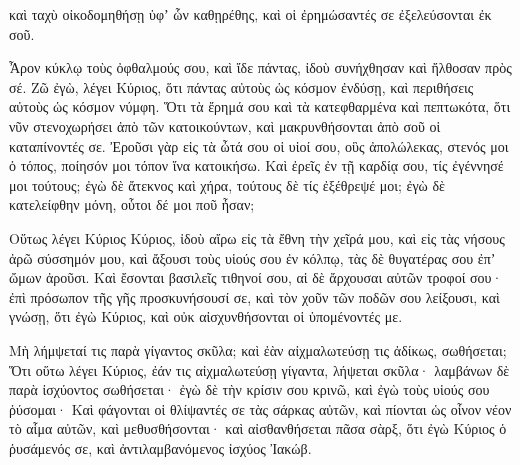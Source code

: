 {καὶ ταχὺ οἰκοδομηθήσῃ ὑφʼ ὧν καθῃρέθης, καὶ οἱ ἐρημώσαντές σε ἐξελεύσονται ἐκ σοῦ.
\par }{\PP {}Ἆρον κύκλῳ τοὺς ὀφθαλμούς σου, καὶ ἴδε πάντας, ἰδοὺ συνήχθησαν καὶ ἤλθοσαν πρὸς σέ. Ζῶ ἐγὼ, λέγει Κύριος, ὅτι πάντας αὐτοὺς ὡς κόσμον ἐνδύσῃ, καὶ περιθήσεις αὐτοὺς ὡς κόσμον νύμφη.
Ὅτι τὰ ἔρημά σου καὶ τὰ κατεφθαρμένα καὶ πεπτωκότα, ὅτι νῦν στενοχωρήσει ἀπὸ τῶν κατοικούντων, καὶ μακρυνθήσονται ἀπὸ σοῦ οἱ καταπίνοντές σε.
Ἐροῦσι γὰρ εἰς τὰ ὦτά σου οἱ υἱοί σου, οὓς ἀπολώλεκας, στενός μοι ὁ τόπος, ποίησόν μοι τόπον ἵνα κατοικήσω.
Καὶ ἐρεῖς ἐν τῇ καρδίᾳ σου, τίς ἐγέννησέ μοι τούτους; ἐγὼ δὲ ἄτεκνος καὶ χήρα, τούτους δὲ τίς ἐξέθρεψέ μοι; ἐγὼ δὲ κατελείφθην μόνη, οὗτοι δέ μοι ποῦ ἦσαν;
\par }{\PP {}Οὕτως λέγει Κύριος Κύριος, ἰδοὺ αἴρω εἰς τὰ ἔθνη τὴν χεῖρά μου, καὶ εἰς τὰς νήσους ἀρῶ σύσσημόν μου, καὶ ἄξουσι τοὺς υἱούς σου ἐν κόλπῳ, τὰς δὲ θυγατέρας σου ἐπʼ ὤμων ἀροῦσι.
Καὶ ἔσονται βασιλεῖς τιθηνοί σου, αἱ δὲ ἄρχουσαι αὐτῶν τροφοί σου· ἐπὶ πρόσωπον τῆς γῆς προσκυνήσουσί σε, καὶ τὸν χοῦν τῶν ποδῶν σου λείξουσι, καὶ γνώσῃ, ὅτι ἐγὼ Κύριος, καὶ οὐκ αἰσχυνθήσονται οἱ ὑπομένοντές με.
\par }{\PP {}Μὴ λήμψεταί τις παρὰ γίγαντος σκῦλα; καὶ ἐὰν αἰχμαλωτεύσῃ τις ἀδίκως, σωθήσεται;
Ὅτι οὕτω λέγει Κύριος, ἐάν τις αἰχμαλωτεύσῃ γίγαντα, λήψεται σκῦλα· λαμβάνων δὲ παρὰ ἰσχύοντος σωθήσεται· ἐγὼ δὲ τὴν κρίσιν σου κρινῶ, καὶ ἐγὼ τοὺς υἱούς σου ῥύσομαι·
Καὶ φάγονται οἱ θλίψαντές σε τὰς σάρκας αὐτῶν, καὶ πίονται ὡς οἶνον νέον τὸ αἷμα αὐτῶν, καὶ μεθυσθήσονται· καὶ αἰσθανθήσεται πᾶσα σὰρξ, ὅτι ἐγὼ Κύριος ὁ ῥυσάμενός σε, καὶ ἀντιλαμβανόμενος ἰσχύος Ἰακώβ.

}

